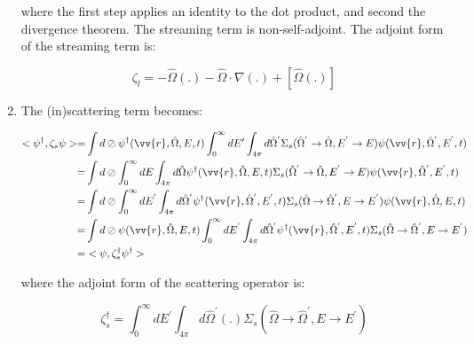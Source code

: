 \documentclass[10pt]{article}
\begin{document}
\begin{flushleft}
\begin{enumerate}
where the first step applies an identity to the dot product, and second the divergence theorem. The streaming term is non-self-adjoint. The adjoint form of the streaming term is:

\begin{equation}
\zeta_l=-\hat{\Omega}(.)-\hat{\Omega}\cdot\nabla(.)+\left\lbrack\hat{\Omega}(.)\right\rbrack
\end{equation}

\item The (in)scattering term becomes:

\begin{equation}
\begin{aligned}
<\psi^\dagger,\zeta_s\psi>=& \int d\oslash\psi^\dagger(\vv{r},\hat{\Omega},E,t)\int_0^\infty dE'\int_{4\pi}d\hat{\Omega}^{'}\Sigma_s(\hat{\Omega}^{'}\rightarrow\hat{\Omega}, E^{'}\rightarrow E)\psi(\vv{r},\hat{\Omega}^{'},E^{'},t)\\
=& \int d\oslash\int_0^\infty dE\int_{4\pi}d\hat{\Omega}\psi^\dagger(\vv{r},\hat{\Omega},E,t)\Sigma_s(\hat{\Omega}^{'}\rightarrow\hat{\Omega}, E^{'}\rightarrow E)\psi(\vv{r},\hat{\Omega}^{'},E^{'},t)\\
=& \int d\oslash\int_0^\infty dE^{'}\int_{4\pi}d\hat{\Omega}^{'}\psi^\dagger(\vv{r},\hat{\Omega}^{'},E^{'},t)\Sigma_s(\hat{\Omega}\rightarrow\hat{\Omega}^{'}, E\rightarrow E^{'})\psi(\vv{r},\hat{\Omega},E,t)\\
=& \int d\oslash\psi(\vv{r},\hat{\Omega},E,t)\int_0^\infty dE^{'}\int_{4\pi}d\hat{\Omega}^{'}\psi^\dagger(\vv{r},\hat{\Omega}^{'},E^{'},t)\Sigma_s(\hat{\Omega}\rightarrow\hat{\Omega}^{'}, E\rightarrow E^{'})\\
=& <\psi, \zeta_s^\dagger\psi^\dagger>
\end{aligned}
\end{equation}

where the adjoint form of the scattering operator is:

\begin{equation}
\zeta_s^\dagger= \int_0^\infty dE^{'}\int_{4\pi}d\hat{\Omega}^{'}(.)\Sigma_s(\hat{\Omega}\rightarrow\hat{\Omega}^{'}, E\rightarrow E^{'})
\end{equation}


\end{enumerate}
\end{flushleft}
\end{document}
